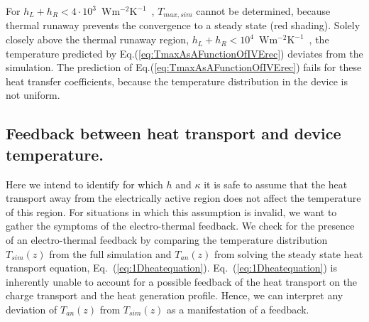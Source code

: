 \documentclass[%
9pt,
 aip,
rsi,%
 amsmath,amssymb,
preprint,%
]{revtex4-1}
\newcommand{\hcoefficient}{$\mathrm{W m^{-2} K^{-1}}$}
\begin{document}
For $h_L + h_R < 4\cdot10^3$~\hcoefficient~, $T_{max,sim}$ cannot be determined, because thermal runaway prevents the convergence to a steady state (red shading).
Solely closely above the thermal runaway region, $h_L + h_R < 10^4$~\hcoefficient~, the temperature predicted by Eq.(\ref{eq:TmaxAsAFunctionOfIVErec}) deviates from the simulation. The prediction of Eq.(\ref{eq:TmaxAsAFunctionOfIVErec}) fails for these heat transfer coefficients, because the temperature distribution in the device is not uniform.



\subsection*{Feedback between heat transport and device temperature.}

Here we intend to identify for which $h$ and $\kappa$ it is safe to assume that the heat transport away from the electrically active region does not affect the temperature of this region. 
For situations in which this assumption is invalid, we want to gather the symptoms of the electro-thermal feedback.
We check for the presence of an electro-thermal feedback by comparing the temperature distribution $T_{sim}(z)$ from the full simulation and $T_{an}(z)$ from solving the steady state heat transport equation, Eq.~(\ref{eq:1Dheatequation}).
Eq.~(\ref{eq:1Dheatequation}) is inherently unable to account for a possible feedback of the heat transport on the charge transport and the heat generation profile.
Hence, we can interpret any deviation of $T_{an}(z)$ from $T_{sim}(z)$ as a manifestation of a feedback.
\end{document}
